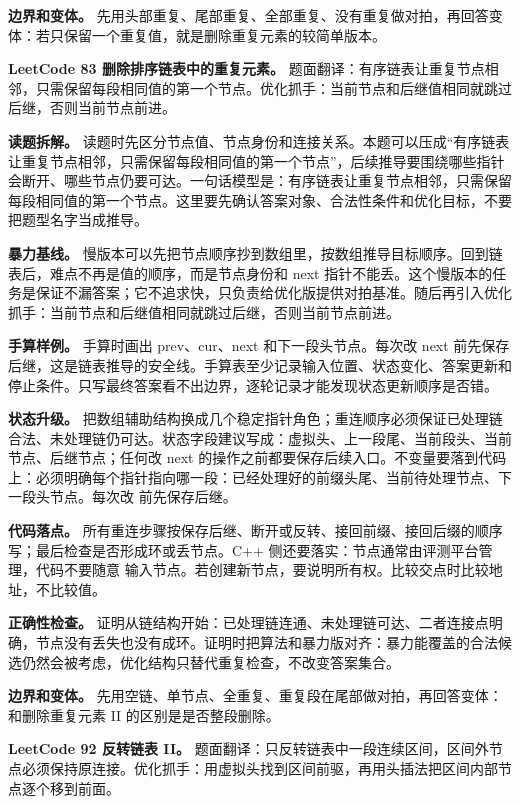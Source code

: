 \textbf{边界和变体。} 先用头部重复、尾部重复、全部重复、没有重复做对拍，再回答变体：若只保留一个重复值，就是删除重复元素的较简单版本。

\noindent\textbf{LeetCode 83 删除排序链表中的重复元素。} 题面翻译：有序链表让重复节点相邻，只需保留每段相同值的第一个节点。优化抓手：当前节点和后继值相同就跳过后继，否则当前节点前进。

\textbf{读题拆解。} 读题时先区分节点值、节点身份和连接关系。本题可以压成“有序链表让重复节点相邻，只需保留每段相同值的第一个节点”，后续推导要围绕哪些指针会断开、哪些节点仍要可达。一句话模型是：有序链表让重复节点相邻，只需保留每段相同值的第一个节点。这里要先确认答案对象、合法性条件和优化目标，不要把题型名字当成推导。

\textbf{暴力基线。} 慢版本可以先把节点顺序抄到数组里，按数组推导目标顺序。回到链表后，难点不再是值的顺序，而是节点身份和 next 指针不能丢。这个慢版本的任务是保证不漏答案；它不追求快，只负责给优化版提供对拍基准。随后再引入优化抓手：当前节点和后继值相同就跳过后继，否则当前节点前进。

\textbf{手算样例。} 手算时画出 prev、cur、next 和下一段头节点。每次改 next 前先保存后继，这是链表推导的安全线。手算表至少记录输入位置、状态变化、答案更新和停止条件。只写最终答案看不出边界，逐轮记录才能发现状态更新顺序是否错。

\textbf{状态升级。} 把数组辅助结构换成几个稳定指针角色；重连顺序必须保证已处理链合法、未处理链仍可达。状态字段建议写成：虚拟头、上一段尾、当前段头、当前节点、后继节点；任何改 next 的操作之前都要保存后续入口。不变量要落到代码上：必须明确每个指针指向哪一段：已经处理好的前缀头尾、当前待处理节点、下一段头节点。每次改  前先保存后继。

\textbf{代码落点。} 所有重连步骤按保存后继、断开或反转、接回前缀、接回后缀的顺序写；最后检查是否形成环或丢节点。C++ 侧还要落实：节点通常由评测平台管理，代码不要随意  输入节点。若创建新节点，要说明所有权。比较交点时比较地址，不比较值。

\textbf{正确性检查。} 证明从链结构开始：已处理链连通、未处理链可达、二者连接点明确，节点没有丢失也没有成环。证明时把算法和暴力版对齐：暴力能覆盖的合法候选仍然会被考虑，优化结构只替代重复检查，不改变答案集合。

\textbf{边界和变体。} 先用空链、单节点、全重复、重复段在尾部做对拍，再回答变体：和删除重复元素 II 的区别是是否整段删除。

\noindent\textbf{LeetCode 92 反转链表 II。} 题面翻译：只反转链表中一段连续区间，区间外节点必须保持原连接。优化抓手：用虚拟头找到区间前驱，再用头插法把区间内部节点逐个移到前面。

